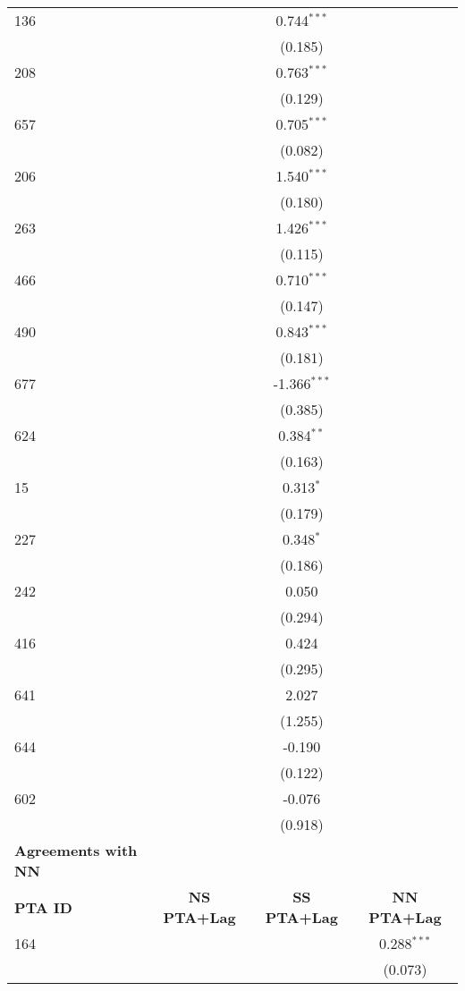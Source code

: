\begin{center}
\begin{longtable}{lccc}
    136 &  & 0.744$^{\ast\ast\ast}$ &  \\
    &  & (0.185) &  \\
    208 &  & 0.763$^{\ast\ast\ast}$ &  \\
    &  & (0.129) &  \\
    657 &  & 0.705$^{\ast\ast\ast}$ &  \\
    &  & (0.082) &  \\
    206 &  & 1.540$^{\ast\ast\ast}$ &  \\
    &  & (0.180) &  \\
    263 &  & 1.426$^{\ast\ast\ast}$ &  \\
    &  & (0.115) &  \\
    466 &  & 0.710$^{\ast\ast\ast}$ &  \\
    &  & (0.147) &  \\
    490 &  & 0.843$^{\ast\ast\ast}$ &  \\
    &  & (0.181) &  \\
    677 &  & -1.366$^{\ast\ast\ast}$ &  \\
    &  & (0.385) &  \\
    624 &  & 0.384$^{\ast\ast}$ &  \\
    &  & (0.163) &  \\
    15  &  & 0.313$^{\ast}$ &  \\
    &  & (0.179) &  \\
    227  &  & 0.348$^{\ast}$ &  \\
    &  & (0.186) &  \\
    242  &  & 0.050 &  \\
    &  & (0.294) &  \\
    416  &  & 0.424 &  \\
    &  & (0.295) &  \\
    641  &  & 2.027 &  \\
    &  & (1.255) &  \\
    644  &  & -0.190 &  \\
    &  & (0.122) &  \\
    602  &  & -0.076 &  \\
    &  & (0.918) &  \\
    \hline
    \textbf{Agreements with NN} &  &  &  \\
    \hline
    \textbf{PTA ID} & \textbf{NS PTA+Lag} & \textbf{SS PTA+Lag} & \textbf{NN PTA+Lag} \\
    \hline
    164 &  &  & 0.288$^{\ast\ast\ast}$ \\
    &  &  & (0.073) \\

\end{longtable}
\end{center}
